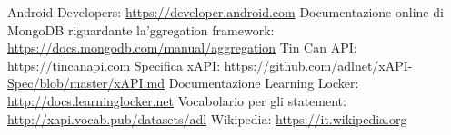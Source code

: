\begin{thebibliography}{9}

	Android Developers: \url{https://developer.android.com} 
	Documentazione online di MongoDB riguardante la'ggregation framework: \url{https://docs.mongodb.com/manual/aggregation} 
	Tin Can API: \url{https://tincanapi.com} 
	Specifica xAPI: \url{https://github.com/adlnet/xAPI-Spec/blob/master/xAPI.md} 
	Documentazione Learning Locker: \url{http://docs.learninglocker.net} 
	Vocabolario per gli statement: \url{http://xapi.vocab.pub/datasets/adl} 
	Wikipedia: \url{https://it.wikipedia.org} 
\end{thebibliography}


	\label{LastPage}
